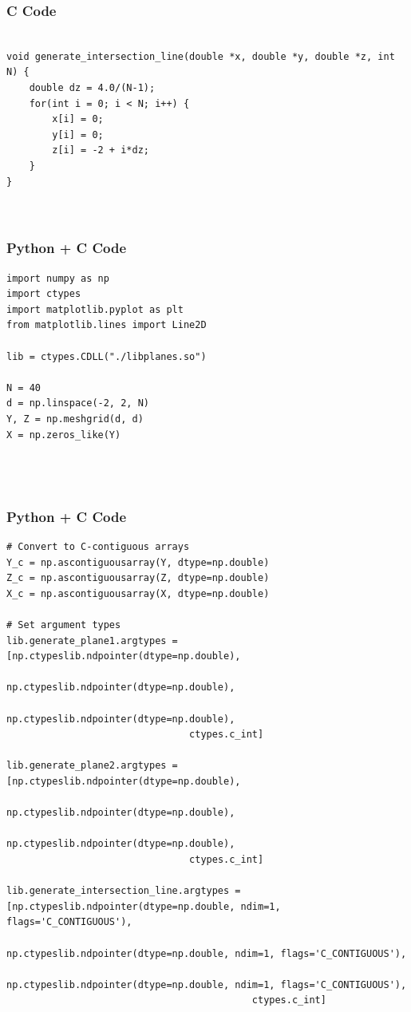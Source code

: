 \documentclass{beamer}
\begin{document}
\begin{frame}[fragile]
    \frametitle{C Code}
    \begin{lstlisting}

void generate_intersection_line(double *x, double *y, double *z, int N) {
    double dz = 4.0/(N-1);
    for(int i = 0; i < N; i++) {
        x[i] = 0;
        y[i] = 0;
        z[i] = -2 + i*dz;
    }
}



    \end{lstlisting}
\end{frame}

\begin{frame}[fragile]
    \frametitle{Python + C Code}
    \begin{lstlisting}
import numpy as np
import ctypes
import matplotlib.pyplot as plt
from matplotlib.lines import Line2D

lib = ctypes.CDLL("./libplanes.so")

N = 40
d = np.linspace(-2, 2, N)
Y, Z = np.meshgrid(d, d)
X = np.zeros_like(Y)




    \end{lstlisting}
\end{frame}
\begin{frame}[fragile]
    \frametitle{Python + C Code}
    \begin{lstlisting}
# Convert to C-contiguous arrays
Y_c = np.ascontiguousarray(Y, dtype=np.double)
Z_c = np.ascontiguousarray(Z, dtype=np.double)
X_c = np.ascontiguousarray(X, dtype=np.double)

# Set argument types
lib.generate_plane1.argtypes = [np.ctypeslib.ndpointer(dtype=np.double),
                                np.ctypeslib.ndpointer(dtype=np.double),
                                np.ctypeslib.ndpointer(dtype=np.double),
                                ctypes.c_int]

lib.generate_plane2.argtypes = [np.ctypeslib.ndpointer(dtype=np.double),
                                np.ctypeslib.ndpointer(dtype=np.double),
                                np.ctypeslib.ndpointer(dtype=np.double),
                                ctypes.c_int]

lib.generate_intersection_line.argtypes = [np.ctypeslib.ndpointer(dtype=np.double, ndim=1, flags='C_CONTIGUOUS'),
                                           np.ctypeslib.ndpointer(dtype=np.double, ndim=1, flags='C_CONTIGUOUS'),
                                           np.ctypeslib.ndpointer(dtype=np.double, ndim=1, flags='C_CONTIGUOUS'),
                                           ctypes.c_int]




    \end{lstlisting}
\end{frame}
\end{document}
